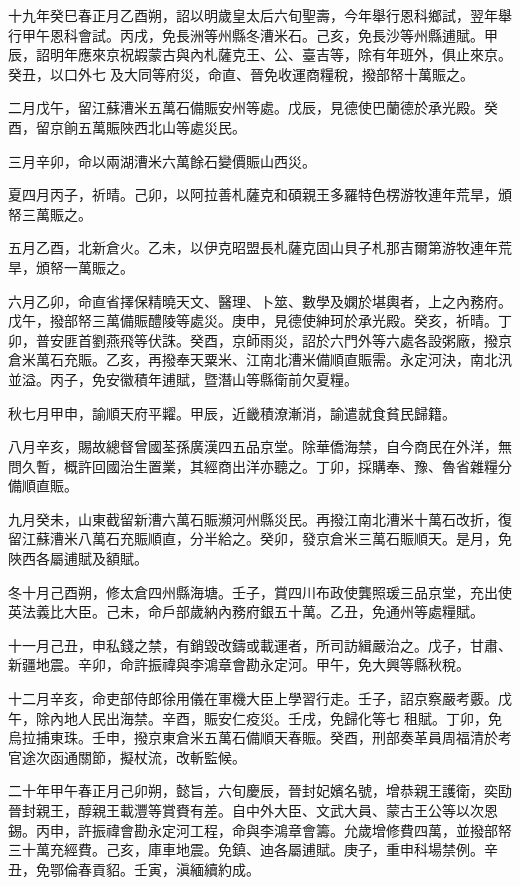 \begin{pinyinscope}
十九年癸巳春正月乙酉朔，詔以明歲皇太后六旬聖壽，今年舉行恩科鄉試，翌年舉行甲午恩科會試。丙戌，免長洲等州縣冬漕米石。己亥，免長沙等州縣逋賦。甲辰，詔明年應來京祝嘏蒙古與內札薩克王、公、臺吉等，除有年班外，俱止來京。癸丑，以口外七及大同等府災，命直、晉免收運商糧稅，撥部帑十萬賑之。

二月戊午，留江蘇漕米五萬石備賑安州等處。戊辰，見德使巴蘭德於承光殿。癸酉，留京餉五萬賑陜西北山等處災民。

三月辛卯，命以兩湖漕米六萬餘石變價賑山西災。

夏四月丙子，祈晴。己卯，以阿拉善札薩克和碩親王多羅特色楞游牧連年荒旱，頒帑三萬賑之。

五月乙酉，北新倉火。乙未，以伊克昭盟長札薩克固山貝子札那吉爾第游牧連年荒旱，頒帑一萬賑之。

六月乙卯，命直省擇保精曉天文、醫理、卜筮、數學及嫻於堪輿者，上之內務府。戊午，撥部帑三萬備賑醴陵等處災。庚申，見德使紳珂於承光殿。癸亥，祈晴。丁卯，普安匪首劉燕飛等伏誅。癸酉，京師雨災，詔於六門外等六處各設粥廠，撥京倉米萬石充賑。乙亥，再撥奉天粟米、江南北漕米備順直賑需。永定河決，南北汛並溢。丙子，免安徽積年逋賦，暨潛山等縣衛前欠夏糧。

秋七月甲申，諭順天府平糶。甲辰，近畿積潦漸消，諭遣就食貧民歸籍。

八月辛亥，賜故總督曾國荃孫廣漢四五品京堂。除華僑海禁，自今商民在外洋，無問久暫，概許回國治生置業，其經商出洋亦聽之。丁卯，採購奉、豫、魯省雜糧分備順直賑。

九月癸未，山東截留新漕六萬石賑瀕河州縣災民。再撥江南北漕米十萬石改折，復留江蘇漕米八萬石充賑順直，分半給之。癸卯，發京倉米三萬石賑順天。是月，免陜西各屬逋賦及額賦。

冬十月己酉朔，修太倉四州縣海塘。壬子，賞四川布政使龔照瑗三品京堂，充出使英法義比大臣。己未，命戶部歲納內務府銀五十萬。乙丑，免通州等處糧賦。

十一月己丑，申私錢之禁，有銷毀改鑄或載運者，所司訪緝嚴治之。戊子，甘肅、新疆地震。辛卯，命許振禕與李鴻章會勘永定河。甲午，免大興等縣秋稅。

十二月辛亥，命吏部侍郎徐用儀在軍機大臣上學習行走。壬子，詔京察嚴考覈。戊午，除內地人民出海禁。辛酉，賑安仁疫災。壬戌，免歸化等七租賦。丁卯，免烏拉捕東珠。壬申，撥京東倉米五萬石備順天春賑。癸酉，刑部奏革員周福清於考官途次函通關節，擬杖流，改斬監候。

二十年甲午春正月己卯朔，懿旨，六旬慶辰，晉封妃嬪名號，增恭親王護衛，奕劻晉封親王，醇親王載灃等賞賚有差。自中外大臣、文武大員、蒙古王公等以次恩錫。丙申，許振禕會勘永定河工程，命與李鴻章會籌。允歲增修費四萬，並撥部帑三十萬充經費。己亥，庫車地震。免鎮、迪各屬逋賦。庚子，重申科場禁例。辛丑，免鄂倫春貢貂。壬寅，滇緬續約成。


\end{pinyinscope}
